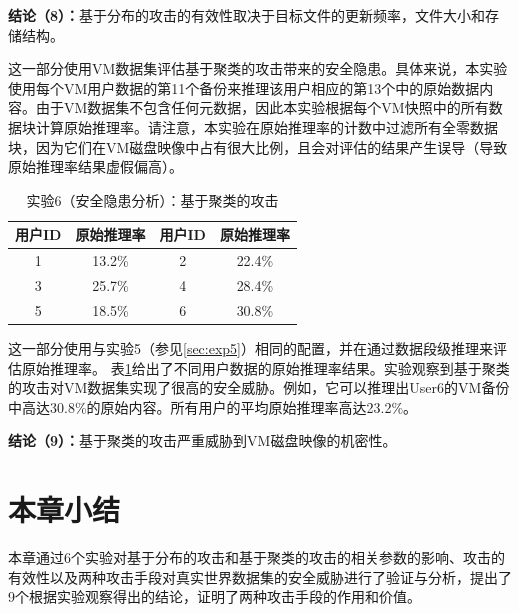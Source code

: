 \textbf{结论（8）：}基于分布的攻击的有效性取决于目标文件的更新频率，文件大小和存储结构。

这一部分使用VM数据集评估基于聚类的攻击带来的安全隐患。具体来说，本实验使用每个VM用户数据的第11个备份来推理该用户相应的第13个中的原始数据内容。由于VM数据集不包含任何元数据，因此本实验根据每个VM快照中的所有数据块计算原始推理率。请注意，本实验在原始推理率的计数中过滤所有全零数据块，因为它们在VM磁盘映像中占有很大比例，且会对评估的结果产生误导（导致原始推理率结果虚假偏高）。

\begin{table}[!htbp]
\small
    \caption{实验6（安全隐患分析）：基于聚类的攻击}
    \centering
    \begin{tabular}{|c|c|c|c|}
    \hline
        {\bf 用户ID} & {\bf 原始推理率} & {\bf 用户ID} & {\bf 原始推理率}\\
    \hline
        1 & 13.2\% & 2 & 22.4\% \\ 
    \hline
        3 & 25.7\% & 4 & 28.4\% \\ 
    \hline
        5 & 18.5\% & 6 & 30.8\% \\ 
    \hline
    \end{tabular}
\label{tab:exp-vm-user-cluster}

\end{table}

这一部分使用与实验5（参见\ref{sec:exp5}）相同的配置，并在通过数据段级推理来评估原始推理率。 表\ref{tab:exp-vm-user-cluster}给出了不同用户数据的原始推理率结果。实验观察到基于聚类的攻击对VM数据集实现了很高的安全威胁。例如，它可以推理出User6的VM备份中高达30.8\%的原始内容。所有用户的平均原始推理率高达23.2\%。

\textbf{结论（9）：}基于聚类的攻击严重威胁到VM磁盘映像的机密性。
\section{本章小结}
本章通过6个实验对基于分布的攻击和基于聚类的攻击的相关参数的影响、攻击的有效性以及两种攻击手段对真实世界数据集的安全威胁进行了验证与分析，提出了9个根据实验观察得出的结论，证明了两种攻击手段的作用和价值。

